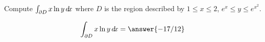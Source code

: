 \documentclass{ximera}
\author{David Guichard \and Neal Koblitz \and H. Jerome Keisler \and Albert Scheller \and Barry Balof \and Mike Wills \and Matthew Carr}
\begin{document}
\begin{exercise}




Compute $\int_{\partial D} x\ln y\mathop{}\!d\! x$ where $D$ is the region described by $1\le x\le 2$, $e^x\le y\le e^{x^2}$. 
 

\begin{prompt}
\[
\int_{\partial D}x\ln y \d x=\answer{-17/12}
\]
\end{prompt}

\end{exercise}
\end{document}
